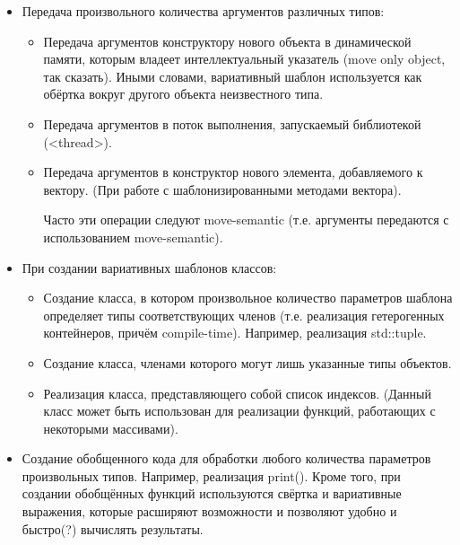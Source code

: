 \documentclass[a4paper,12pt]{article}	%
\begin{document}
	\begin{itemize}
	
	\item Передача произвольного количества аргументов различных типов:
	
	\begin{itemize}
	
		\item Передача аргументов конструктору нового объекта в динамической памяти, которым владеет интеллектуальный указатель (move only object, так сказать). Иными словами, вариативный шаблон используется как обёртка вокруг другого объекта неизвестного типа.
		
		\item Передача аргументов в поток выполнения, запускаемый библиотекой (<thread>).
		
		\item Передача аргументов в конструктор нового элемента, добавляемого к вектору. (При работе с шаблонизированными методами вектора).
		
		Часто эти операции следуют move-semantic (т.е. аргументы передаются с использованием move-semantic).		
	
	\end{itemize}
	
	\item При создании вариативных шаблонов классов:
	
	\begin{itemize}
	
		\item Создание класса, в котором произвольное количество параметров шаблона определяет типы соответствующих членов (т.е. реализация гетерогенных контейнеров, причём compile-time). Например, реализация std::tuple.
	
		\item Создание класса, членами которого могут лишь указанные типы объектов.
	
		\item Реализация класса, представляющего собой список индексов. (Данный класс может быть использован для реализации функций, работающих с некоторыми массивами).
		
	\end{itemize}
	
	\item Создание обобщенного кода для обработки любого количества параметров произвольных типов. Например, реализация print(). Кроме того, при создании обобщённых функций используются свёртка и вариативные выражения, которые расширяют возможности и позволяют удобно и быстро(?) вычислять результаты.
	
	\end{itemize}
	
\end{document}

